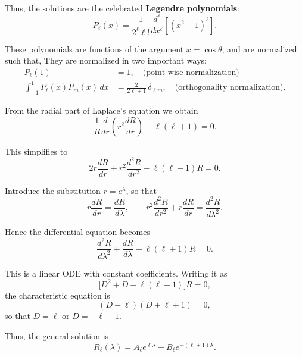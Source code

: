 \documentclass{article}
\begin{document}
Thus, the solutions are the celebrated \textbf{Legendre polynomials}:
\begin{equation}
P_\ell(x) = \frac{1}{2^\ell \ell!}
\frac{d^\ell}{dx^\ell}\!\left[ (x^2-1)^\ell \right].
\end{equation}

These polynomials are functions of the argument $x=\cos\theta$, 
and are normalized such that,
They are normalized in two important ways:
\begin{align*}
P_\ell(1) &= 1, \quad \text{(point-wise normalization)} \\[6pt]
\int_{-1}^1 P_\ell(x) P_m(x)\, dx &= \frac{2}{2\ell+1}\,\delta_{\ell m}, 
\quad \text{(orthogonality normalization).}
\end{align*}

From the radial part of Laplace’s equation we obtain
\begin{equation*}
\frac{1}{R}\frac{d}{dr}\!\left( r^2 \frac{dR}{dr} \right) - \ell(\ell+1) = 0.
\end{equation*}

This simplifies to
\begin{equation*}
2r \frac{dR}{dr} + r^2 \frac{d^2R}{dr^2} - \ell(\ell+1)R = 0.
\end{equation*}

Introduce the substitution $r = e^\lambda$, so that
\begin{equation*}
r \frac{dR}{dr} = \frac{dR}{d\lambda}, 
\qquad
r^2 \frac{d^2R}{dr^2} + r \frac{dR}{dr} = \frac{d^2R}{d\lambda^2}.
\end{equation*}

Hence the differential equation becomes
\begin{equation*}
\frac{d^2R}{d\lambda^2} + \frac{dR}{d\lambda} - \ell(\ell+1)R = 0.
\end{equation*}

This is a linear ODE with constant coefficients. Writing it as
\begin{equation*}
\big[D^2 + D - \ell(\ell+1)\big]R = 0,
\end{equation*}
the characteristic equation is
\begin{equation*}
(D-\ell)(D+\ell+1) = 0,
\end{equation*}
so that $D=\ell$ or $D=-\ell-1$.

Thus, the general solution is
\begin{equation*}
R_\ell(\lambda) = A_\ell e^{\ell \lambda} + B_\ell e^{-(\ell+1)\lambda}.
\end{equation*}
\end{document}
